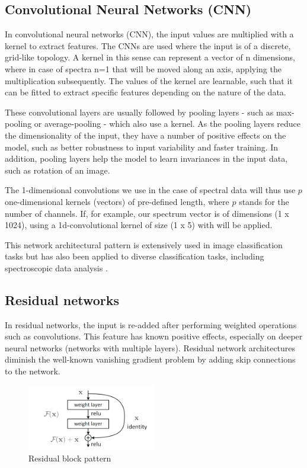 \subsection{Convolutional Neural Networks (CNN)}

In convolutional neural networks (CNN), the input values are multiplied with a kernel to extract features. The CNNs are used where the input is of a discrete, grid-like topology. A kernel in this sense can represent a vector of n dimensions, where in case of spectra n=1 that will be moved along an axis, applying the multiplication subsequently. The values of the kernel are learnable, such that it can be fitted to extract specific features depending on the nature of the data.

These convolutional layers are usually followed by pooling layers - such as max-pooling or average-pooling - which also use a kernel. As the pooling layers reduce the dimensionality of the input, they have a number of positive effects on the model, such as better robustness to input variability and faster training. In addition, pooling layers help the model to learn invariances in the input data, such as rotation of an image. 

The 1-dimensional convolutions we use in the case of spectral data will thus use $p$ one-dimensional kernels (vectors) of pre-defined length, where $p$ stands for the number of channels. If, for example, our spectrum vector is of dimensions (1 x 1024), using a 1d-convolutional kernel of size (1 x 5) with will be applied.

This network architectural pattern is extensively used in image classification tasks but has also been applied to diverse classification tasks, including spectroscopic data analysis \cite{sun_cnnlstm_2023, castorena_deep_2021, drera_deep_2019}.

\subsection{Residual networks}

In residual networks, the input is re-added after performing weighted operations such as convolutions. This feature has known positive effects, especially on deeper neural networks (networks with multiple layers). Residual network architectures diminish the well-known vanishing gradient problem by adding skip connections to the network. 

\begin{figure}
    \centering
    \includegraphics[width=0.5\textwidth]{Figures/ResBlockVariants.png}
    \caption{Residual block pattern}
    \label{fig:res_block}
\end{figure}

